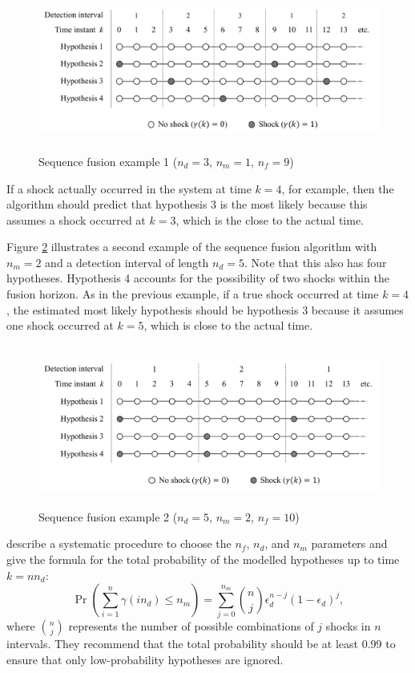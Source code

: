 \begin{figure}[htp]
	\centering
	\includegraphics[height=5.3cm]{images/mm_obs_seq_rob1.pdf}
	\caption{Sequence fusion example 1 ($n_d=3$, $n_m=1$, $n_f=9$)}
	\label{fig:mm-obs-seq-rob1}
\end{figure}

If a shock actually occurred in the system at time $k=4$, for example, then the algorithm should predict that hypothesis 3 is the most likely because this assumes a shock occurred at $k=3$, which is the close to the actual time.

Figure \ref{fig:mm-obs-seq-rob2} illustrates a second example of the sequence fusion algorithm with $n_m=2$ and a detection interval of length $n_d=5$.  Note that this also has four hypotheses. Hypothesis 4 accounts for the possibility of two shocks within the fusion horizon. As in the previous example, if a true shock occurred at time $k=4$, the estimated most likely hypothesis should be hypothesis 3 because it assumes one shock occurred at $k=5$, which is close to the actual time.

\begin{figure}[htp]
	\centering
	\includegraphics[height=5.3cm]{images/mm_obs_seq_rob2.pdf}
	\caption{Sequence fusion example 2 ($n_d=5$, $n_m=2$, $n_f=10$)}
	\label{fig:mm-obs-seq-rob2}
\end{figure}

\cite{robertson_detection_1995} describe a systematic procedure to choose the $n_f$, $n_d$, and $n_m$ parameters and give the formula for the total probability of the modelled hypotheses up to time $k=n n_d$:
\begin{equation} \label{eq:p_gamma}
	\operatorname{Pr}\left(\sum_{i=1}^{n} \gamma(i n_d) \leq n_m\right) = \sum_{j=0}^{n_m} \binom{n}{j} \epsilon_d^{n-j}(1-\epsilon_d)^{j},
\end{equation}
where $\binom{n}{j}$ represents the number of possible combinations of $j$ shocks in $n$ intervals. They recommend that the total probability should be at least 0.99 to ensure that only low-probability hypotheses are ignored.

